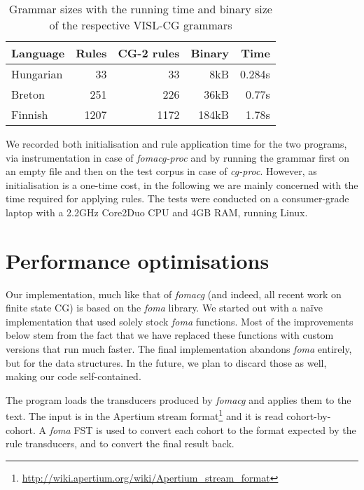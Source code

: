 \documentclass[11pt]{article}
\begin{document}
\begin{table*}[h]
  \centering
  \caption{Grammar sizes with the running time and binary size of the respective
           VISL-CG grammars}
  \label{tab:grammar_size}
  \begin{tabular}{ | l | r | r | r | r | }
  \hline
  \textbf{Language} & \textbf{Rules} & \textbf{CG-2 rules} &
  \textbf{Binary} & \textbf{Time} \\
  \hline
  Hungarian &   33 &   33 &   8kB & 0.284s \\
  Breton    &  251 &  226 &  36kB & 0.77s \\
  Finnish   & 1207 & 1172 & 184kB & 1.78s \\
  \hline
  \end{tabular}
\end{table*}

We recorded both initialisation and rule application time for the two programs,
via instrumentation in case of \emph{fomacg-proc} and by running the grammar
first on an empty file and then on the test corpus in case of \emph{cg-proc}.
However, as initialisation is a one-time cost, in the following we are mainly
concerned with the time required for applying rules. The tests were conducted on
a consumer-grade laptop with a 2.2GHz Core2Duo CPU and 4GB RAM, running Linux.

\section{Performance optimisations}
\label{sec:speed}

Our implementation, much like that of \emph{fomacg} (and indeed, all recent
work on finite state CG) is based on the \emph{foma} library. We started out
with a naïve implementation that used solely stock \emph{foma} functions. Most
of the improvements below stem from the fact that we have replaced these
functions with custom versions that run much faster. The final implementation
abandons \emph{foma} entirely, but for the data structures. In the future, we
plan to discard those as well, making our code self-contained.

The program loads the transducers produced by \emph{fomacg} and applies them
to the text. The input is in the Apertium stream
format\footnote{\url{http://wiki.apertium.org/wiki/Apertium_stream_format}}
and it is read cohort-by-cohort. A \emph{foma} FST is used to convert each
cohort to the format expected by the rule transducers, and to convert the final
result back.
\end{document}
